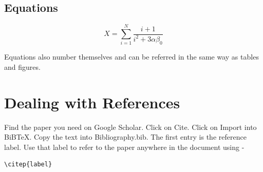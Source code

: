 \subsection{Equations}

\begin{equation}
X = \sum_{i=1}^{N}{\frac{i+1}{i^2 + 3\alpha\beta_0}}
\label{eqn: equationLabel}
\end{equation}

Equations also number themselves and can be referred in the same way as tables and figures.

\section{Dealing with References}

Find the paper you need on Google Scholar. Click on Cite. Click on Import into BiBTeX. Copy the text into Bibliography.bib. The first entry is the reference label. Use that label to refer to the paper anywhere in the document using - 
\begin{verbatim}
\citep{label}
\end{verbatim}




